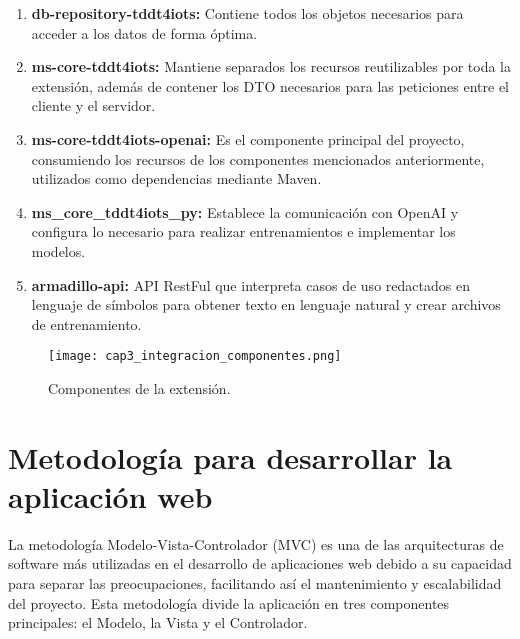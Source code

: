 \begin{enumerate}
	\item \textbf{db-repository-tddt4iots:} Contiene todos los objetos necesarios para acceder a los datos de forma óptima.
	\item \textbf{ms-core-tddt4iots:} Mantiene separados los recursos reutilizables por toda la extensión, además de contener los DTO necesarios para las peticiones entre el cliente y el servidor.
	\item \textbf{ms-core-tddt4iots-openai:} Es el componente principal del proyecto, consumiendo los recursos de los componentes mencionados anteriormente, utilizados como dependencias mediante Maven.
	\item \textbf{ms\_core\_tddt4iots\_py:} Establece la comunicación con OpenAI y configura lo necesario para realizar entrenamientos e implementar los modelos.
	\item \textbf{armadillo-api:} API RestFul que interpreta casos de uso redactados en lenguaje de símbolos para obtener texto en lenguaje natural y crear archivos de entrenamiento.
\end{enumerate}

	\begin{figure}[H]  
		\centering
		\texttt{[image: cap3\_integracion\_componentes.png]}
		\caption{Componentes de la extensión.}
		\label{fig:cap3_integracion_componentes}
	\end{figure}


\section{Metodología para desarrollar la aplicación web}

La metodología Modelo-Vista-Controlador (MVC) es una de las arquitecturas de software más utilizadas en el desarrollo de aplicaciones web debido a su capacidad para separar las preocupaciones, facilitando así el mantenimiento y escalabilidad del proyecto. Esta metodología divide la aplicación en tres componentes principales: el Modelo, la Vista y el Controlador.


